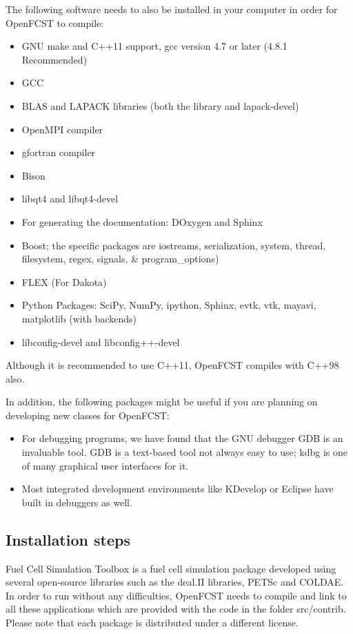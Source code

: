 The following software needs to also be installed in your computer in order for OpenFCST to compile:
\begin{itemize}
 \item GNU make and C++11 support, gcc version 4.7 or later (4.8.1 Recommended)
 \item GCC
 \item BLAS and LAPACK libraries (both the library and lapack-devel)
 \item OpenMPI compiler
 \item gfortran compiler
 \item Bison
 \item libqt4 and libqt4-devel
 \item For generating the documentation: DOxygen and Sphinx
 \item Boost; the specific packages are iostreams, serialization, system, thread, 
       filesystem, regex, signals, \& program\_options)
 \item FLEX (For Dakota)
 \item Python Packages: SciPy, NumPy, ipython, Sphinx, evtk, vtk, mayavi, matplotlib (with backends)
 \item libconfig-devel and libconfig++-devel
\end{itemize}
Although it is recommended to use C++11, OpenFCST compiles with C++98 also.

In addition, the following packages might be useful if you are planning on developing new classes for OpenFCST:
\begin{itemize}
  \item For debugging programs, we have found that the GNU debugger GDB is an invaluable tool. GDB is a text-based tool not always easy to use; kdbg is one of many graphical user interfaces for it. \item Most integrated development environments like KDevelop or Eclipse have built in debuggers as well.
\end{itemize}


\subsection{Installation steps}

Fuel Cell Simulation Toolbox is a fuel cell simulation package developed using several open-source libraries such as the deal.II libraries, PETSc and COLDAE. In order to run without any difficulties, OpenFCST needs to compile and link to all these applications which are provided with the code in the folder src/contrib. Please note that each package is distributed under a different license. 

